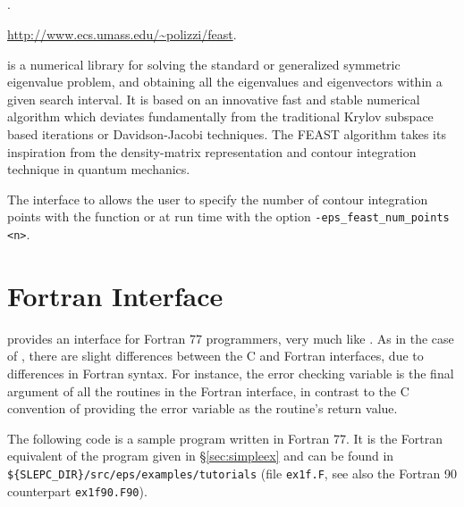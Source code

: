 \subsection*{\underline{\feast}}
	\begin{description}
	\setlength{\itemsep}{0pt}
	\item[References.]\citep{Polizzi:2009:DAS}.
	\item[Website.] \url{http://www.ecs.umass.edu/~polizzi/feast}.
	\item[Summary.] \feast is a numerical library for solving the standard or generalized symmetric eigenvalue problem, and obtaining all the eigenvalues and eigenvectors within a given search interval. It is based on an innovative fast and stable numerical algorithm which deviates fundamentally from the traditional Krylov subspace based iterations or Davidson-Jacobi techniques. The FEAST algorithm takes its inspiration from the density-matrix representation and contour integration technique in quantum mechanics.
	\item[Specific options.] The \slepc interface to \feast allows the user to specify the number of contour integration points with the function  or at run time with the option \Verb!-eps_feast_num_points <n>!.
	\end{description}

\section{Fortran Interface}
\label{sec:fortran}

	\slepc provides an interface for Fortran 77 programmers, very much like \petsc. As in the case of \petsc, there are slight differences between the C and Fortran \slepc interfaces, due to differences in Fortran syntax. For instance, the error checking variable is the final argument of all the routines in the Fortran interface, in contrast to the C convention of providing the error variable as the routine's return value.

	The following code is a sample program written in Fortran 77. It is the Fortran equivalent of the program given in \S\ref{sec:simpleex} and can be found in \Verb!${SLEPC_DIR}/src/eps/examples/tutorials! (file \texttt{ex1f.F}, see also the Fortran 90 counterpart \texttt{ex1f90.F90}).

